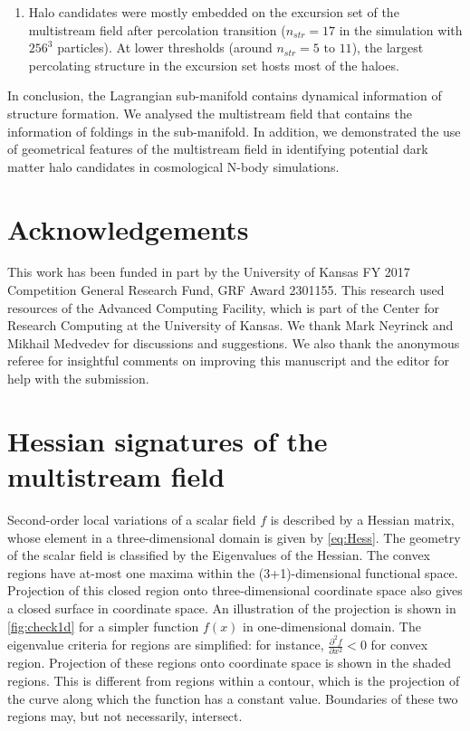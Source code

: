 \documentclass[fleqn,usenatbib,useAMS]{mnras}
\begin{document}
\begin{enumerate}
\item Halo candidates were mostly embedded on the excursion set of the multistream field after percolation transition ($n_{str} = 17$ in the simulation with $256^3$ particles). At lower thresholds (around $n_{str} = 5 \text{ to } 11$), the largest percolating structure in the excursion set hosts most of the haloes.     

\end{enumerate}

In conclusion, the Lagrangian sub-manifold contains dynamical information of structure formation. We analysed the multistream field that contains the information of foldings in the sub-manifold. In addition, we demonstrated the use of geometrical features of the multistream field in identifying potential dark matter halo candidates in cosmological N-body simulations. 


\section*{Acknowledgements}

This work has been funded in part by the University of Kansas FY 2017 Competition General Research Fund, GRF Award 2301155. This research used resources of the Advanced Computing Facility, which is part of the Center for Research Computing at the University of Kansas. We thank Mark Neyrinck and Mikhail Medvedev for discussions and suggestions. We also thank the anonymous referee for insightful comments on improving this manuscript and the editor for help with the submission. 





\appendix

\section{Hessian signatures of the multistream field}
\label{appendix:Eigen}


Second-order local variations of a scalar field $f$ is described by a Hessian matrix, whose element in a three-dimensional domain is given by \autoref{eq:Hess}. The geometry of the scalar field is classified by the Eigenvalues of the Hessian. The convex regions have at-most one maxima within the (3+1)-dimensional functional space. Projection of this closed region onto three-dimensional coordinate space also gives a closed surface in coordinate space. An illustration of the projection is shown in \autoref{fig:check1d} for a simpler function $f(x)$ in one-dimensional domain. The eigenvalue criteria for regions are simplified: for instance, $\frac{\partial^2 f}{\partial x^2} < 0$ for convex region. Projection of these regions onto coordinate space is shown in the shaded regions. This is different from regions within a contour, which is the projection of the curve along which the function has a constant value. Boundaries of these two regions may, but not necessarily, intersect. 
\end{document}
